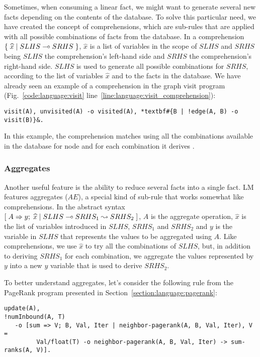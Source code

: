 Sometimes, when consuming a linear fact, we might want to generate several new
facts depending on the contents of the database. To solve this particular need,
we have created the concept of comprehensions, which are sub-rules that are
applied with all possible combinations of facts from the database. In a
comprehension $\{ \; \widehat{x} \; | \; SLHS \multimap SRHS \; \}$, $\widehat{x}$ is a list
of variables in the scope of $SLHS$ and $SRHS$ being $SLHS$ the comprehension's
left-hand side and $SRHS$ the comprehension's right-hand side. $SLHS$ is used to
generate all possible combinations for $SRHS$, according to the list of
variables $\hat{x}$ and to the facts in the database. We have already seen an
example of a comprehension in the graph visit program (Fig.~\ref{code:language:visit}
line~\ref{line:language:visit_comprehension}):

\begin{Verbatim}[fontsize=\codesize,commandchars=\*\#\&]
visit(A), unvisited(A) -o visited(A), *textbf#{B | !edge(A, B) -o visit(B)}&.
\end{Verbatim}

In this example, the comprehension matches  using all the
combinations available in the database for node  and for each
combination it derives .

\subsubsection{Aggregates}

Another useful feature is the ability to reduce several facts
into a single fact. LM features aggregates ($AE$), a special kind of sub-rule
that works somewhat like comprehensions. In the abstract syntax
$[\; A \Rightarrow y; \; \widehat{x} \; | \; SLHS \multimap SRHS_1 \leadsto SRHS_2 \;]$, $A$ is the aggregate
operation, $\widehat{x}$ is the list of variables introduced in $SLHS$, $SRHS_1$
and $SRHS_2$ and $y$ is the variable in $SLHS$ that represents the values to be
aggregated using $A$. Like comprehensions, we use $\widehat{x}$ to try all the
combinations of $SLHS$, but, in addition to deriving $SRHS_1$ for each
combination, we aggregate the values represented by $y$ into a new $y$ variable
that is used to derive $SRHS_2$.

To better understand aggregates, let's consider the following rule from the
PageRank program presented in Section~\ref{section:language:pagerank}:

\begin{Verbatim}[fontsize=\codesize]
update(A),
!numInbound(A, T)
   -o [sum => V; B, Val, Iter | neighbor-pagerank(A, B, Val, Iter), V =
         Val/float(T) -o neighbor-pagerank(A, B, Val, Iter) -> sum-ranks(A, V)].
\end{Verbatim}

